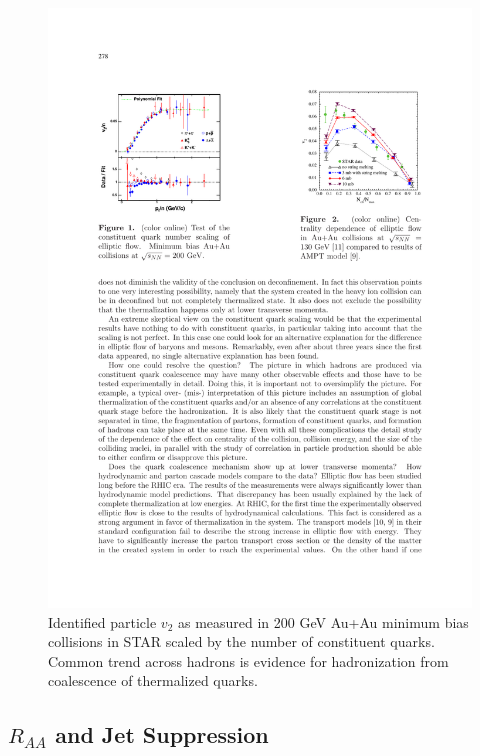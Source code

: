 \begin{figure}[htbp]
\begin{center}
\includegraphics[scale=1.7]{Plots/Intro/ncq_scale.pdf}
\end{center}
\caption[NCQ Scaling of $v_2$]{Identified particle $v_2$ as measured in 200 GeV Au+Au minimum bias collisions in STAR scaled by the number of constituent quarks. Common trend across hadrons is evidence for hadronization from coalescence of thermalized quarks.}
\label{fig:ncqscale}
\end{figure}

\subsection{$R_{AA}$ and Jet Suppression}

